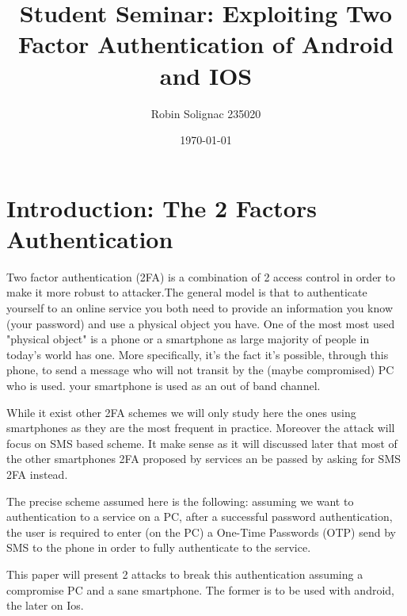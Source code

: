 \documentclass[11pt, a4paper,twocolumn]{article}
\title{Student Seminar: Exploiting Two Factor Authentication of Android and IOS}
\author{Robin Solignac 235020}
\date{\today}
\begin{document}
\maketitle
\begin{comment}
\begin{abstract}
Applications  which  can  be  used  in  different  platforms  now  use  two
factor authentication (2FA) to allow users to conveniently switch from one platform to another.
For example, when a user tries to login his gmail, it is not enough to enter correct password 
(first factor), it is also necessary to enter a PIN which is received by an SMS (second factor).
The aim of this project explaining the attacks against 2FA in IOS and Android devices and 
what can be the solutions. 
\end{abstract}
\end{comment}

\section{Introduction: The 2 Factors Authentication}

Two factor authentication (2FA) is a combination of 2 access control  in order to make it more robust to attacker.The general model is that to authenticate yourself to an online service you both need to provide an information you know (your password) and use a physical object you have. 
One of the most most used "physical object" is a phone or a smartphone
as large majority of people in today's world has one.
More specifically, it's the fact it's possible, through this phone, to send a message who will not transit by the (maybe compromised) PC 
who is used. your smartphone is used as an out of band channel.

While it exist other 2FA schemes we will only study here the ones using smartphones as they are the most frequent in practice. Moreover the attack will focus on SMS based scheme.
It make sense as it will discussed later that most of the other smartphones 2FA proposed by services an be passed by asking for SMS 2FA instead.

The precise scheme assumed here is the following: assuming we want to authentication to a service on a PC, after a successful password authentication, the user is required to enter (on the PC) a One-Time Passwords (OTP) send by SMS to the phone in order to fully authenticate to the service. 

This paper will present 2 attacks to break this authentication assuming a compromise PC and a sane smartphone. The former is to be used with android, the later on Ios.
\end{document}
